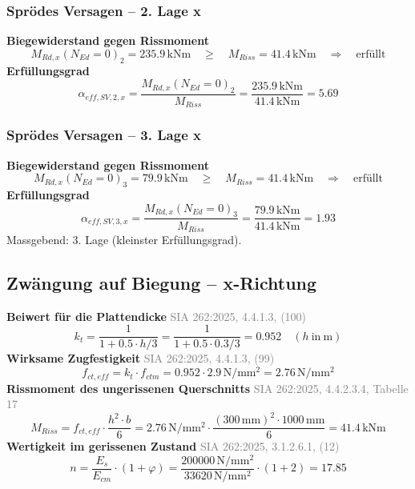 \documentclass[11pt,a4paper]{article}
\newcommand{\normref}[1]{{\small\textcolor{gray}{#1}}}
\begin{document}
\subsubsection{Sprödes Versagen – 2. Lage x}
\noindent\textbf{Biegewiderstand gegen Rissmoment}
\begin{equation*}
M_{Rd,x}(N_{Ed} = 0)_{2} = 235.9\,\mathrm{kNm} \quad \ge \quad M_{Riss} = 41.4\,\mathrm{kNm} \quad \Rightarrow \quad \text{erfüllt}
\end{equation*}
\noindent\textbf{Erfüllungsgrad}
\begin{equation*}
\alpha_{eff,SV,2,x} = \frac{M_{Rd,x}(N_{Ed} = 0)_{2}}{M_{Riss}} = \frac{235.9\,\mathrm{kNm}}{41.4\,\mathrm{kNm}} = 5.69
\end{equation*}
\subsubsection{Sprödes Versagen – 3. Lage x}
\noindent\textbf{Biegewiderstand gegen Rissmoment}
\begin{equation*}
M_{Rd,x}(N_{Ed} = 0)_{3} = 79.9\,\mathrm{kNm} \quad \ge \quad M_{Riss} = 41.4\,\mathrm{kNm} \quad \Rightarrow \quad \text{erfüllt}
\end{equation*}
\noindent\textbf{Erfüllungsgrad}
\begin{equation*}
\alpha_{eff,SV,3,x} = \frac{M_{Rd,x}(N_{Ed} = 0)_{3}}{M_{Riss}} = \frac{79.9\,\mathrm{kNm}}{41.4\,\mathrm{kNm}} = 1.93
\end{equation*}
Massgebend: 3. Lage (kleinster Erfüllungsgrad).

\subsection{Zwängung auf Biegung – x-Richtung}
\noindent\textbf{Beiwert für die Plattendicke} \hfill \normref{SIA 262:2025, 4.4.1.3, (100)}
\begin{equation*}
k_t = \frac{1}{1 + 0.5 \cdot h/3} = \frac{1}{1 + 0.5 \cdot 0.3/3} = 0.952 \quad \left(h\ \text{in}\ \mathrm{m}\right)
\end{equation*}
\noindent\textbf{Wirksame Zugfestigkeit} \hfill \normref{SIA 262:2025, 4.4.1.3, (99)}
\begin{equation*}
f_{ct,eff} = k_t \cdot f_{ctm} = 0.952 \cdot 2.9\,\mathrm{N}/\mathrm{mm}^{2} = 2.76\,\mathrm{N}/\mathrm{mm}^{2}
\end{equation*}
\noindent\textbf{Rissmoment des ungerissenen Querschnitts} \hfill \normref{SIA 262:2025, 4.4.2.3.4, Tabelle 17}
\begin{equation*}
M_{Riss} = f_{ct,eff} \cdot \frac{h^{2} \cdot b}{6} = 2.76\,\mathrm{N}/\mathrm{mm}^{2} \cdot \frac{\left(300\,\mathrm{mm}\right)^{2} \cdot 1000\,\mathrm{mm}}{6} = 41.4\,\mathrm{kNm}
\end{equation*}
\noindent\textbf{Wertigkeit im gerissenen Zustand} \hfill \normref{SIA 262:2025, 3.1.2.6.1, (12)}
\begin{equation*}
n = \frac{E_s}{E_{cm}} \cdot \left(1 + \varphi\right) = \frac{200000\,\mathrm{N}/\mathrm{mm}^{2}}{33620\,\mathrm{N}/\mathrm{mm}^{2}} \cdot \left(1 + 2\right) = 17.85
\end{equation*}
\end{document}
